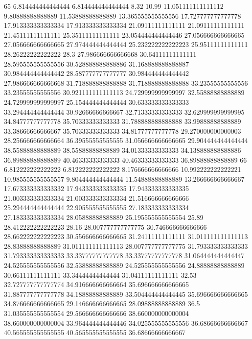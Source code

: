 65 6.814444444444444 6.814444444444444 8.32 10.99 11.051111111111112 9.80888888888889 11.53888888888889 13.365555555555556 17.727777777777778 17.913333333333334 17.913333333333334 21.09111111111111 21.09111111111111 21.45111111111111 25.35111111111111 23.054444444444446 27.056666666666665 27.056666666666665 27.974444444444444 25.232222222222223 25.95111111111111 28.26222222222222 28.3 27.986666666666668 30.64111111111111 28.595555555555556 30.528888888888886 31.168888888888887 30.984444444444442 28.587777777777777 30.984444444444442 27.986666666666668 31.718888888888888 31.718888888888888 33.23555555555556 33.23555555555556 30.921111111111113 24.729999999999997 32.55888888888889 24.729999999999997 25.154444444444444 30.633333333333333 33.294444444444444 30.92666666666667 32.71333333333333 32.629999999999995 34.84777777777778 35.70333333333333 31.788888888888888 33.99888888888889 33.38666666666667 35.70333333333333 34.81777777777778 29.270000000000003 28.256666666666664 36.39555555555555 31.056666666666665 29.904444444444444 38.55888888888889 38.55888888888889 34.01333333333333 34.138888888888886 36.89888888888889 40.46333333333333 40.46333333333333 36.89888888888889
66 6.812222222222222 6.812222222222222 8.176666666666666 10.992222222222221 10.985555555555557 9.804444444444444 11.54888888888889 13.266666666666667 17.673333333333332 17.943333333333335 17.943333333333335 21.003333333333334 21.003333333333334 21.516666666666666 25.294444444444444 22.905555555555555 27.183333333333334 27.183333333333334 28.05888888888889 25.195555555555554 25.89 28.412222222222223 28.16 28.007777777777775 30.746666666666666 28.662222222222223 30.556666666666665 31.24111111111111 31.011111111111113 28.83888888888889 31.011111111111113 28.007777777777775 31.793333333333333 31.793333333333333 33.33777777777778 33.33777777777778 31.064444444444447 24.525555555555556 32.53888888888889 24.525555555555556 24.88888888888889 30.66111111111111 33.34444444444444 31.04111111111111 32.53 32.727777777777774 34.916666666666664 35.696666666666665 31.887777777777778 34.18888888888889 33.504444444444445 35.696666666666665 34.876666666666665 29.146666666666665 28.09888888888889 36.5 31.035555555555554 29.566666666666666 38.660000000000004 38.660000000000004 33.964444444444446 34.025555555555556 36.68666666666667 40.565555555555555 40.565555555555555 36.68666666666667
